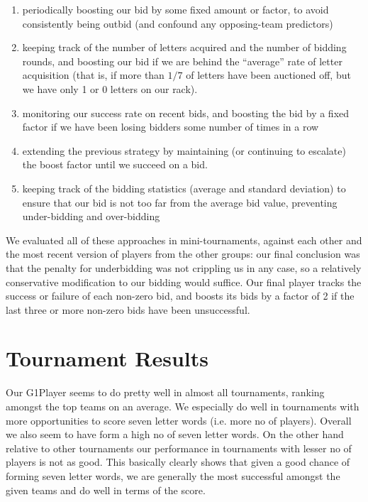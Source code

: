 \documentclass[11pt]{article}
\begin{document}
\begin{enumerate}
\item{} periodically boosting our bid by some fixed amount or factor, to avoid consistently being outbid (and confound any opposing-team predictors)
\item{} keeping track of the number of letters acquired and the number of bidding rounds, and boosting our bid if we are behind the ``average'' rate of letter acquisition (that is, if more than $1/7$ of letters have been auctioned off, but we have only 1 or 0 letters on our rack). %
\item monitoring our success rate on recent bids, and boosting the bid by a fixed factor if we have been losing bidders some number of times in a row
\item extending the previous strategy by maintaining (or continuing to escalate) the boost factor until we succeed on a bid.
\item keeping track of the bidding statistics (average and standard deviation) to ensure that our bid is not too far from the average bid value, preventing under-bidding and over-bidding
\end{enumerate}

We evaluated all of these approaches in mini-tournaments, against each other and the most recent version of players from the other groups: our final conclusion was that the penalty for underbidding was not crippling us in any case, so a relatively conservative modification to our bidding would suffice.  Our final player tracks the success or failure of each non-zero bid, and boosts its bids by a factor of 2 if the last three or more non-zero bids have been unsuccessful. %


\section{Tournament Results} %
	Our G1Player seems to do pretty well in almost all tournaments, ranking amongst the top teams on an average. We especially do well in tournaments with more opportunities to score seven letter words (i.e. more no of players). Overall we also seem to have form a high no of seven letter words. On the other hand relative to other tournaments our performance in tournaments with lesser no of players is not as good. This basically clearly shows that given a good chance of forming seven letter words, we are generally the most successful amongst the given teams and do well in terms of the score.
	
\end{document}

